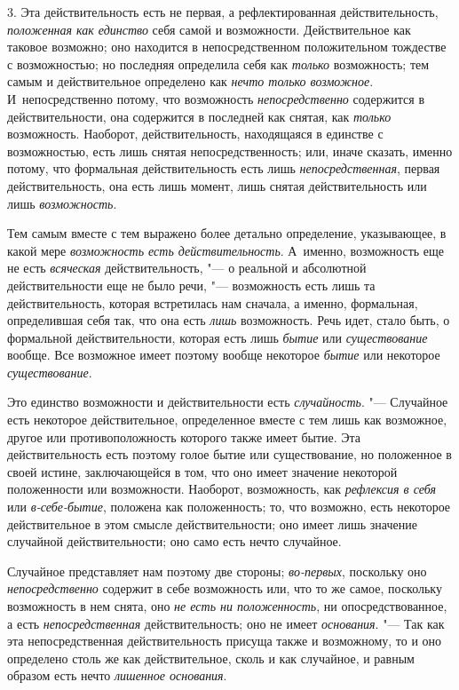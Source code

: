 3. Эта действительность есть не первая, а рефлектированная действительность,
{\em положенная как единство} себя самой и возможности.
Действительное как таковое возможно; оно находится в непосредственном
положительном тождестве с возможностью; но последняя определила себя как
{\em только} возможность; тем самым и действительное
определено как {\em нечто только возможное}.
И~непосредственно потому, что возможность
{\em непосредственно} содержится в действительности,
она содержится в последней как снятая, как {\em только}
возможность. Наоборот, действительность, находящаяся в единстве с
возможностью, есть лишь снятая непосредственность; или, иначе сказать,
именно потому, что формальная действительность есть лишь
{\em непосредственная}, первая действительность, она
есть лишь момент, лишь снятая действительность или лишь
{\em возможность}.

Тем самым вместе с тем выражено более детально определение, указывающее, в
какой мере {\em возможность есть действительность}.
А~именно, возможность еще не есть {\em всяческая}
действительность, "--- о реальной и абсолютной действительности еще не было
речи, "--- возможность есть лишь та действительность, которая встретилась нам
сначала, а именно, формальная, определившая себя так, что она есть
{\em лишь} возможность. Речь идет, стало быть, о
формальной действительности, которая есть лишь
{\em бытие} или {\em существование}
вообще. Все возможное имеет поэтому вообще некоторое
{\em бытие} или некоторое
{\em существование}.

Это единство возможности и действительности есть
{\em случайность}. "--- Случайное есть некоторое
действительное, определенное вместе с тем лишь как возможное, другое или
противоположность которого также имеет бытие. Эта действительность есть
поэтому голое бытие или существование, но положенное в своей истине,
заключающейся в том, что оно имеет значение некоторой положенности или
возможности. Наоборот, возможность, как {\em рефлексия
в себя} или {\em в-себе-бытие}, положена как
положенность; то, что возможно, есть некоторое действительное в этом смысле
действительности; оно имеет лишь значение случайной действительности; оно
само есть нечто случайное.

Случайное представляет нам поэтому две стороны;
{\em во-первых}, поскольку оно
{\em непосредственно} содержит в себе возможность или,
что то же самое, поскольку возможность в нем снята, оно
{\em не есть ни положенность}, ни опосредствованное, а
есть {\em непосредственная} действительность; оно не
имеет {\em основания}. "--- Так как эта непосредственная
действительность присуща также и возможному, то и оно определено столь же
как действительное, сколь и как случайное, и равным образом есть нечто
{\em лишенное основания}.

